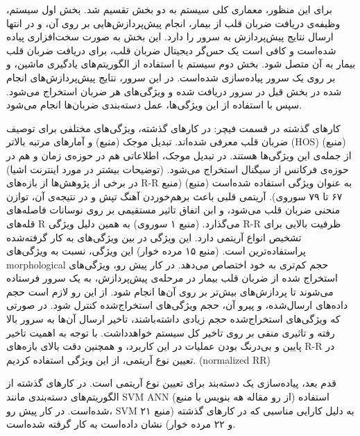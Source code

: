  برای این منظور، معماری کلی سیستم به دو بخش تقسیم شد. بخش اول سیستم، وظیفه‌ی دریافت ضربان قلب از بیمار،‌ انجام پیش‌پردازش‌هایی بر روی آن، و در انتها ارسال نتایج پیش‌پردازش به سرور را دارد. این بخش به صورت سخت‌افزاری پیاده شده‌است و کافی است یک حس‌گر دیجیتال ضربان قلب، برای دریافت ضربان قلب بیمار به آن متصل شود. 
بخش دوم سیستم با استفاده از الگوریتم‌های یادگیری ماشین، و بر روی یک سرور پیاده‌سازی شده‌است. در این سرور، نتایج پیش‌پردازش‌های انجام شده در بخش قبل در سرور دریافت شده و ویژگی‌های هر ضربان استخراج می‌شود. سپس با استفاده از این ویژگی‌ها، عمل دسته‌بندی ضربان‌ها انجام می‌شود.

کارهای گذشته در قسمت فیچر:
در کارهای گذشته، ویژگی‌های مختلفی برای توصیف ضربان قلب معرفی شده‌اند. تبدیل موجک (منبع) و آمارهای مرتبه بالاتر (HOS) (منبع) از جمله‌ی این ویژگی‌ها هستند. در تبدیل موجک، اطلاعاتی هم در حوزه‌ی زمان و هم در حوزه‌ی فرکانس از سیگنال استخراج می‌شود. 
(توضیحات بیشتر در مورد اینترنت اشیا)
در برخی از پژوهش‌ها از بازه‌های R-R به عنوان ویژگی استفاده شده‌است (منبع) (منبع ۶۷ تا ۷۹ سوروی). آریتمی قلبی باعث برهم‌خوردن آهنگ تپش و در نتیجه‌ی آن، توازن منحنی ضربان قلب می‌شود، و ابن اتفاق تاثیر مستقیمی بر روی نوسانات فاصله‌های قله‌های R می‌گذارد. (منبع ۱ سوروی) به همین دلیل ویژگی R-R ظرفیت بالایی برای تشخیص انواع آریتمی دارد. این ویژگی در بین ویژگی‌های به کار گرفته‌شده پراستفاده‌ترین است. (منبع ۱۵ مرده خوار)
این ویژگی، نسبت به ویژگی‌های morphological حجم کم‌تری به خود اختصاص می‌دهد. در کار پیش رو، ویژگی‌های استخراج شده از ضربان قلب بیمار در مرحله‌ی پیش‌پردازش، به یک سرور فرستاده می‌شوند تا پردازش‌های بیش‌تر بر روی آن‌ها انجام شود. از این رو لازم است حجم داده‌های ارسال‌شده، و پیرو آن، حجم ویژگی‌های استخراج‌شده کنترل شود. در صورتی که ویژگی‌های استخراج‌شده حجم زیادی داشته‌باشند، تاخیر ارسال آن‌ها به سرور بالا رفته و تاثیری منفی بر روی تاخیر کل سیستم خواهدداشت. با توجه به اهمیت تاخیر پایین و بی‌درنگ بودن عملیات در این کاربرد، و همچنین دقت بالای بازه‌های R-R در تعیین نوع آریتمی، از این ویژگی استفاده کردیم. 
(normalized RR)

قدم بعد، پیاده‌سازی یک دسته‌بند برای تعیین نوع آریتمی است. در کارهای گذشته از الگوریتم‌های دسته‌بندی مانند SVM ANN (از رو مقاله هه بنویس با منبع) استفاده شده‌است. در کار پیش رو، SVM به دلیل کارایی مناسبی که در کارهای گذشته (منبع ۲۱ و ۲۲ مرده خوار) نشان داده‌است به کار گرفته شده‌است. 


